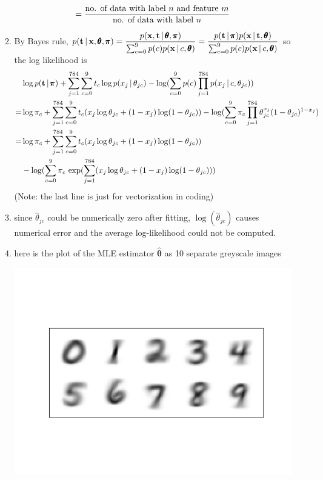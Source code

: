 \documentclass[12pt]{article}
\begin{document}
\begin{enumerate}
\begin{enumerate}
\begin{gather*}
      = \frac{\text{{no. of data with label $n$ and feature $m$}}}{\text{{no. of data with label $n$}}}
    \end{gather*}
    \item By Bayes rule, $p(\textbf t \,|\, \textbf x, \pmb \theta, \pmb \pi) = 
    \displaystyle\frac{p(\textbf x , \textbf t \,|\, \pmb \theta, \pmb \pi)}{\sum_{c=0}^9 p(c)p(\textbf x \,|\, c, \pmb \theta)}
    = \displaystyle\frac{p(\textbf t \,|\, \pmb \pi) p(\textbf x \,|\, \textbf t, \pmb \theta)}{\sum_{c=0}^9 p(c)p(\textbf x \,|\, c, \pmb \theta)}$
    so the log likelihood is \\
    \begin{align*}
    & \log p(\textbf t \,|\, \pmb \pi) + \sum_{j=1}^{784} \sum_{c=0}^9 t_c \log p(x_j \,|\, \theta_{jc}) - 
    \log (\sum_{c=0}^9 p(c) \prod_{j=1}^{784} p(x_j \,|\, c, \theta_{jc})) \\
    =& \log \pi_c + \sum_{j=1}^{784} \sum_{c=0}^9 t_c (x_j \log \theta_{jc} + (1-x_j) \log (1 - \theta_{jc}))
    - \log (\sum_{c=0}^9 \pi_c \prod_{j=1}^{784} \theta_{jc}^{x_j} (1 - \theta_{jc})^{1 - x_j}) \\
    =& \log \pi_c + \sum_{j=1}^{784} \sum_{c=0}^9 t_c (x_j \log \theta_{jc} + (1-x_j) \log (1 - \theta_{jc}))  \\
    &- \log (\sum_{c=0}^9 \pi_c \, \exp(\sum_{j=1}^{784} (x_j \log \theta_{jc} + (1 - x_j) \log (1 - \theta_{jc})))
    \end{align*}
    (Note: the last line is just for vectorization in coding)
    \item since $\hat{\theta}_{jc}$ could be numerically zero after fitting, $\log (\hat{\theta}_{jc})$ causes
    numerical error and the average log-likelihood could not be computed.
    \newpage
    \item here is the plot of the MLE estimator $\hat{\pmb \theta}$ as 10 separate greyscale images \\
    \begin{center}\includegraphics[scale=0.7]{mle.png} \end{center} 

\end{enumerate}
\end{enumerate}
\end{document}
